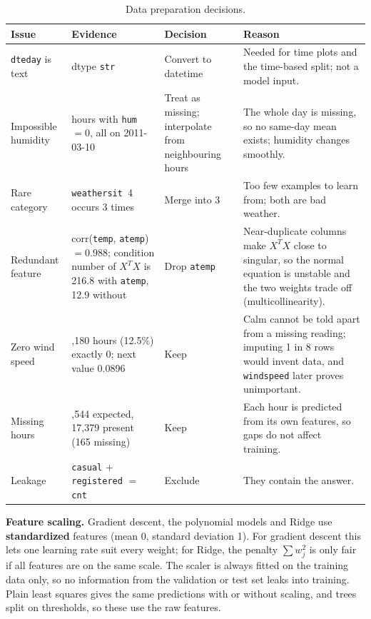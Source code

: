 \documentclass[11pt]{article}
\newcommand{\code}[1]{\texttt{#1}}
\begin{document}
\begin{table}[H]
\centering
\caption{Data preparation decisions.}
\label{tab:prep}
\small
\begin{tabularx}{\linewidth}{@{}>{\raggedright\arraybackslash}p{2.4cm} >{\raggedright\arraybackslash}p{3.6cm} >{\raggedright\arraybackslash}p{2.6cm} X@{}}
\toprule
Issue & Evidence & Decision & Reason \\
\midrule
\code{dteday} is text & dtype \code{str} & Convert to datetime & Needed for time plots and the time-based split; not a model input. \\
Impossible humidity & 22 hours with \code{hum}$=0$, all on 2011-03-10 & Treat as missing; interpolate from neighbouring hours & The whole day is missing, so no same-day mean exists; humidity changes smoothly. \\
Rare category & \code{weathersit}~4 occurs 3 times & Merge into 3 & Too few examples to learn from; both are bad weather. \\
Redundant feature & corr(\code{temp}, \code{atemp}) $=0.988$; condition number of $X^TX$ is 216.8 with \code{atemp}, 12.9 without & Drop \code{atemp} & Near-duplicate columns make $X^TX$ close to singular, so the normal equation is unstable and the two weights trade off (multicollinearity). \\
Zero wind speed & 2,180 hours (12.5\%) exactly 0; next value 0.0896 & Keep & Calm cannot be told apart from a missing reading; imputing 1 in 8 rows would invent data, and \code{windspeed} later proves unimportant. \\
Missing hours & 17,544 expected, 17,379 present (165 missing) & Keep & Each hour is predicted from its own features, so gaps do not affect training. \\
Leakage & \code{casual} + \code{registered} $=$ \code{cnt} & Exclude & They contain the answer. \\
\bottomrule
\end{tabularx}
\end{table}

\textbf{Feature scaling.} Gradient descent, the polynomial models and Ridge use
\textbf{standardized} features (mean 0, standard deviation 1). For gradient descent this lets one
learning rate suit every weight; for Ridge, the penalty $\sum w_j^2$ is only fair if all features
are on the same scale. The scaler is always fitted on the training data only, so no information
from the validation or test set leaks into training. Plain least squares gives the same predictions
with or without scaling, and trees split on thresholds, so these use the raw features.
\end{document}
